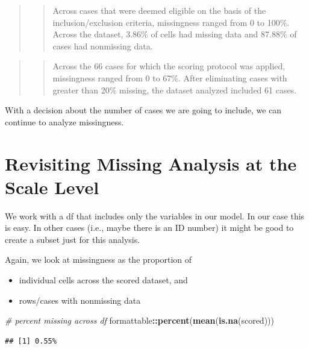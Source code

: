 \documentclass[
  11pt,
]{book}
\newenvironment{Shaded}{\begin{snugshade}}{\end{snugshade}}
\newcommand{\CommentTok}[1]{\textcolor[rgb]{0.37,0.37,0.37}{\textit{#1}}}
\newcommand{\FunctionTok}[1]{\textcolor[rgb]{0.27,0.27,0.27}{\textbf{#1}}}
\newcommand{\NormalTok}[1]{#1}
\newcommand{\SpecialCharTok}[1]{\textcolor[rgb]{0.43,0.43,0.43}{\textbf{#1}}}
\providecommand{\tightlist}{%
  \setlength{\itemsep}{0pt}\setlength{\parskip}{0pt}}
\begin{document}
\begin{quote}
\begin{quote}
Across cases that were deemed eligible on the basis of the inclusion/exclusion criteria, missingness ranged from 0 to 100\%. Across the dataset, 3.86\% of cells had missing data and 87.88\% of cases had nonmissing data.
\end{quote}
\end{quote}

\begin{quote}
\begin{quote}
Across the 66 cases for which the scoring protocol was applied, missingness ranged from 0 to 67\%. After eliminating cases with greater than 20\% missing, the dataset analyzed included 61 cases.
\end{quote}
\end{quote}

With a decision about the number of cases we are going to include, we can continue to analyze missingness.

\hypertarget{revisiting-missing-analysis-at-the-scale-level}{%
\section{Revisiting Missing Analysis at the Scale Level}\label{revisiting-missing-analysis-at-the-scale-level}}

We work with a df that includes only the variables in our model. In our case this is easy. In other cases (i.e., maybe there is an ID number) it might be good to create a subset just for this analysis.

Again, we look at missingness as the proportion of

\begin{itemize}
\tightlist
\item
  individual cells across the scored dataset, and
\item
  rows/cases with nonmissing data
\end{itemize}

\begin{Shaded}
\begin{Highlighting}[]
\CommentTok{\# percent missing across df}
\NormalTok{formattable}\SpecialCharTok{::}\FunctionTok{percent}\NormalTok{(}\FunctionTok{mean}\NormalTok{(}\FunctionTok{is.na}\NormalTok{(scored)))}
\end{Highlighting}
\end{Shaded}

\begin{verbatim}
## [1] 0.55%
\end{verbatim}
\end{document}
